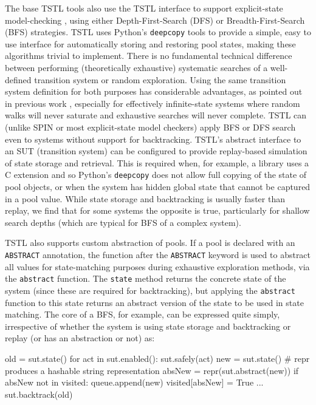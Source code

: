 The base TSTL tools also use the TSTL interface to support explicit-state model-checking \cite{ModelChecking,SPIN}, using either Depth-First-Search (DFS) or Breadth-First-Search (BFS) strategies.  TSTL uses Python's {\tt deepcopy} tools to provide a simple, easy to use interface for automatically storing and restoring pool states, making these algorithms trivial to implement.  There is no fundamental technical difference between performing (theoretically exhaustive) systematic searches of a well-defined transition system or random exploration.  Using the same transition system definition for both purposes has considerable advantages, as pointed out in previous work \cite{woda08}, especially for effectively infinite-state systems where random walks will never saturate and exhaustive searches will never complete.
TSTL can (unlike SPIN or most explicit-state model checkers) apply BFS or DFS search even to systems without support for backtracking.  TSTL's abstract interface to an SUT (transition system) can be configured to provide replay-based simulation of state storage and retrieval.  This is required when, for example, a library uses a C extension and so Python's {\tt deepcopy} does not allow full copying of the state of pool objects, or when the system has hidden global state that cannot be captured in a pool value.  While state storage and backtracking is usually faster than replay, we find that for some systems the opposite is true, particularly for shallow search depths (which are typical for BFS of a complex system).

TSTL also supports custom abstraction of pools.  If a pool is declared with an {\tt ABSTRACT} annotation, the function after the {\tt ABSTRACT} keyword is used to abstract all values for state-matching purposes during exhaustive exploration methods, via the {\tt abstract} function.  The {\tt state} method returns the concrete state of the system (since these are required for backtracking), but applying the {\tt abstract} function to this state returns an abstract version of the state to be used in state matching.  The core of a BFS, for example, can be expressed quite simply, irrespective of whether the system is using state storage and backtracking or replay (or has an abstraction or not) as:

{\scriptsize 
\begin{code}
old = sut.state()
for act in sut.enabled():
   sut.safely(act)
   new = sut.state()
   \# repr produces a hashable string representation
   absNew = repr(sut.abstract(new))
   if absNew not in visited:
      queue.append(new)
      visited[absNew] = True
      ...
   sut.backtrack(old)
\end{code}
}


